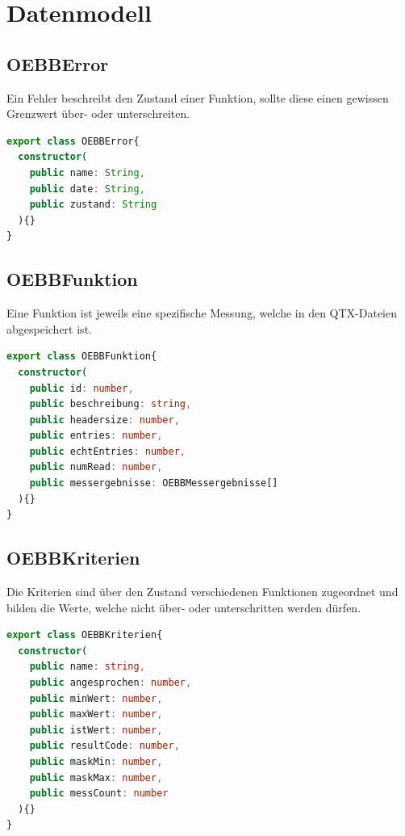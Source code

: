 \section{Datenmodell}
\subsection{OEBBError}
Ein Fehler beschreibt den Zustand einer Funktion, sollte diese einen gewissen Grenzwert über- oder unterschreiten.

\begin{lstlisting}[language=Typescript, caption={OEBB-Error}]
export class OEBBError{
  constructor(
    public name: String,
    public date: String,
    public zustand: String
  ){}
}
\end{lstlisting}

\subsection{OEBBFunktion}
Eine Funktion ist jeweils eine spezifische Messung, welche in den QTX-Dateien abgespeichert ist.

\begin{lstlisting}[language=Typescript, caption={OEBB-Funktion}]
export class OEBBFunktion{
  constructor(
    public id: number,
    public beschreibung: string,
    public headersize: number,
    public entries: number,
    public echtEntries: number,
    public numRead: number,
    public messergebnisse: OEBBMessergebnisse[]
  ){}
}
\end{lstlisting}

\subsection{OEBBKriterien}\label{OEBBKriterien}
Die Kriterien sind über den Zustand verschiedenen Funktionen zugeordnet und bilden die Werte, welche nicht über- oder unterschritten 
werden dürfen.

\begin{lstlisting}[language=Typescript, caption={OEBB-Kriterien}]
export class OEBBKriterien{
  constructor(
    public name: string,
    public angesprochen: number,
    public minWert: number,
    public maxWert: number,
    public istWert: number,
    public resultCode: number,
    public maskMin: number,
    public maskMax: number,
    public messCount: number
  ){}
}
\end{lstlisting}


